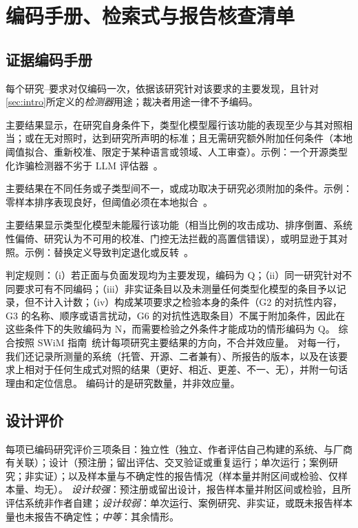 \section{编码手册、检索式与报告核查清单}
\label{app:codebook}

\subsection{证据编码手册}
每个研究--要求对仅编码一次，依据该研究针对该要求的主要发现，且针对\cref{sec:intro}所定义的\emph{检测器}用途；裁决者用途一律不予编码。
\begin{description}[leftmargin=1.2em,itemsep=2pt]
  \item[S（支持）] 主要结果显示，在研究自身条件下，类型化模型履行该功能的表现至少与其对照相当；或在无对照时，达到研究所声明的标准；且无需研究额外附加任何条件（本地阈值拟合、重新校准、限定于某种语言或领域、人工审查）。示例：一个开源类型化诈骗检测器不劣于 LLM 评估器~\cite{arx23959}。
  \item[Q（有条件）] 主要结果在不同任务或子类型间不一，或成功取决于研究必须附加的条件。示例：零样本排序表现良好，但阈值必须在本地拟合~\cite{arx29429}。
  \item[N（不支持）] 主要结果显示类型化模型未能履行该功能（相当比例的攻击成功、排序倒置、系统性偏倚、研究认为不可用的校准、门控无法拦截的高置信错误），或明显逊于其对照。示例：替换定义导致判定退化或反转~\cite{arx26758}。
\end{description}
判定规则：（i）若正面与负面发现均为主要发现，编码为 Q；（ii）同一研究针对不同要求可有不同编码；（iii）非实证条目以及未测量任何类型化模型的条目予以记录，但不计入计数；（iv）构成某项要求之检验本身的条件（G2 的对抗性内容，G3 的名称、顺序或语言扰动，G6 的对抗性选取条目）不属于附加条件，因此在这些条件下的失败编码为 N，而需要检验之外条件才能成功的情形编码为 Q。
综合按照 SWiM 指南~\cite{campbell2020swim}统计每项研究主要结果的方向，不合并效应量。
对每一行，我们还记录所测量的系统（托管、开源、二者兼有）、所报告的\jev{}版本，以及在该要求上相对于任何生成式对照的结果（更好、相近、更差、不一、无），并附一句话理由和定位信息。
编码计的是研究数量，并非效应量。

\subsection{设计评价}
每项已编码研究评价三项条目：独立性（独立、作者评估自己构建的系统、与厂商有关联）；设计（预注册；留出评估、交叉验证或重复运行；单次运行；案例研究；非实证）；以及样本量与不确定性的报告情况（样本量并附区间或检验、仅样本量、均无）。
\emph{设计较强}：预注册或留出设计，报告样本量并附区间或检验，且所评估系统非作者自建；\emph{设计较弱}：单次运行、案例研究、非实证，或既未报告样本量也未报告不确定性；\emph{中等}：其余情形。

